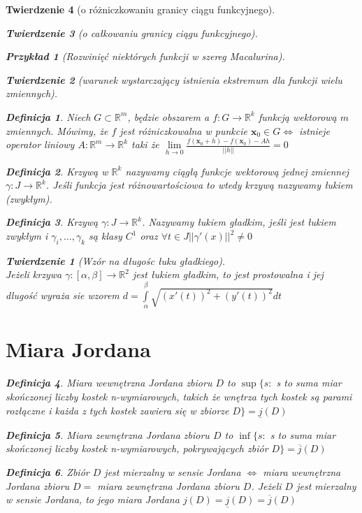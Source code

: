 \documentclass[12pt,a4paper]{article}
\newtheorem{tw}{Twierdzenie}
\newtheorem{przyklad}{Przykład}
\theoremstyle{definition}
\newtheorem{df}{Definicja}
\begin{document}
\begin{tw}[o różniczkowaniu granicy ciągu funkcyjnego]
\begin{tw}[o całkowaniu granicy ciągu funkcyjnego]
\begin{przyklad}[Rozwinięć niektórych funkcji w szereg Macalurina]
\begin{tw}[warunek wystarczający istnienia ekstremum dla funkcji wielu zmiennych]
\begin{df}
Niech $G\subset\mathbb{R}^m$, będzie obszarem a $f: G\to\mathbb{R}^k$ funkcją wektorową $m$ zmiennych. Mówimy, że $f$ jest różniczkowalna w punkcie $\mathbf{x}_0\in G \Leftrightarrow$ istnieje operator liniowy $A: \mathbb{R}^m \to \mathbb{R}^k$ taki że $\lim\limits_{h\to 0}\frac{f(\mathbf{x}_0+h)-f(\mathbf{x}_0)-Ah}{||h||} = 0$
\end{df}

\begin{df}
Krzywą w $\mathbb{R}^k$ nazywamy ciągłą funkcje wektorową jednej zmiennej $\gamma: J\to\mathbb{R}^k$. Jeśli funkcja jest różnowartościowa to wtedy krzywą nazywamy łukiem (zwykłym).
\end{df}
\begin{df}
Krzywą $\gamma: J\to\mathbb{R}^k$. Nazywamy łukiem gładkim, jeśli jest łukiem zwykłym i $\gamma_i, \dots ,\gamma_k$ są klasy $C^1$ oraz $\forall t\in J ||\gamma '(x)||^2 \neq 0$
\end{df}

\begin{tw}[Wzór na długośc łuku gładkiego]~\\
Jeżeli krzywa $\gamma :[\alpha , \beta ] \to\mathbb{R}^2$ jest łukiem gładkim, to jest prostowalna i jej dlugość wyraża sie wzorem $d = \int\limits_\alpha^\beta \sqrt{(x'(t))^2 + (y'(t))^2}dt$
\end{tw}

\section{Miara Jordana}
\begin{df}
Miara wewnętrzna Jordana zbioru $D$ to $\sup\{s:$ s to suma miar skończonej liczby kostek n-wymiarowych, takich że wnętrza tych kostek są parami rozłączne i każda z tych kostek zawiera się w zbiorze $D\} = \underline{j}(D)$
\end{df}
\begin{df}
Miara zewnętrzna Jordana zbioru $D$ to $\inf\{s:$ s to suma miar skończonej liczby kostek n-wymiarowych, pokrywających zbiór $ D\} = \overline{j}(D)$
\end{df}

\begin{df}
Zbiór $D$ jest mierzalny w sensie Jordana $\Leftrightarrow$ miara wewnętrzna Jordana zbioru $D = $ miara zewnętrzna Jordana zbioru $D$. 
Jeżeli $D$ jest mierzalny w sensie Jordana, to jego miara Jordana $j(D) = \underline{j}(D) = \overline{j}(D)$
\end{df}


\end{tw}
\end{przyklad}
\end{tw}
\end{tw}
\end{document}

